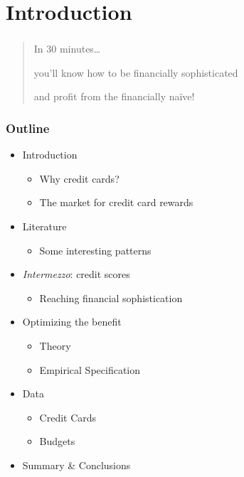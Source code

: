 
\section{Introduction}

\begin{frame}
    \frametitle{ }
    \begin{quote}
        \centerline{In 30 minutes\ldots}
        \vskip 16pt
        \centerline{you'll know how to be financially sophisticated}
        \centerline{and profit from the financially na\"{i}ve!}
    \end{quote}
\end{frame}

\begin{frame}
    \frametitle{Outline}

    \begin{itemize}
        \item Introduction
        \begin{itemize}
            \item Why credit cards?
            \item The market for credit card rewards
        \end{itemize}

        \item Literature
        \begin{itemize}
            \item Some interesting patterns
        \end{itemize}

        \item \emph{Intermezzo}: credit scores
        \begin{itemize}
            \item Reaching financial sophistication
        \end{itemize}

        \item Optimizing the benefit
        \begin{itemize}
            \item Theory
            \item Empirical Specification
         \end{itemize}

         \item Data
         \begin{itemize}
            \item Credit Cards 
            \item Budgets
        \end{itemize}

        \item Summary \& Conclusions
    \end{itemize}
\end{frame}

